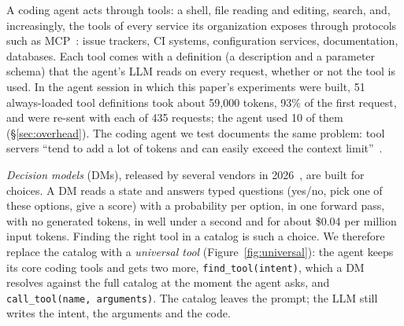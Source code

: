 A coding agent acts through tools: a shell, file reading and editing, search, and, increasingly, the tools of
every service its organization exposes through protocols such as MCP~\citep{mcp}: issue trackers, CI systems,
configuration services, documentation, databases. Each tool comes with a definition (a description and a
parameter schema) that the agent's LLM reads on every request, whether or not the tool is used. In the agent
session in which this paper's experiments were built, 51 always-loaded tool definitions took about
59{,}000 tokens, 93\% of the first request, and were re-sent with each of 435 requests; the agent used 10 of
them (\S\ref{sec:overhead}). The coding agent we test documents the same problem: tool servers ``tend to add a
lot of tokens and can easily exceed the context limit''~\citep{opencode}.

\emph{Decision models} (DMs), released by several vendors in 2026~\citep{typesafejev,msd1,openrouterdecisions},
are built for choices. A DM reads a state and answers typed questions (yes/no, pick one of these options, give a
score) with a probability per option, in one forward pass, with no generated tokens, in well under a second
and for about \$0.04 per million input tokens. Finding the right tool in a catalog is such a choice. We
therefore replace the catalog with a \emph{universal tool} (Figure~\ref{fig:universal}): the agent keeps its
core coding tools and gets two more, \texttt{find\_tool(intent)}, which a DM resolves against the full catalog
at the moment the agent asks, and \texttt{call\_tool(name, arguments)}. The catalog leaves the prompt; the LLM
still writes the intent, the arguments and the code.

